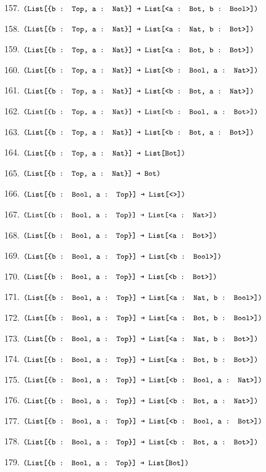 \documentclass[dvipsnames]{article}
\let\codeOrig\code
\renewcommand{\code}[2][]{%
  \ifmmode
    \if\relax\detokenize{#1}\relax
      \mathchoice{\mbox{\normalfont\small\ttfamily #2}}{\mbox{\normalfont\small\ttfamily #2}}{\mbox{\normalfont\small\ttfamily #2}}{\mbox{\normalfont\small\ttfamily #2}}%
    \else
      \mathchoice{\mbox{\normalfont\small\ttfamily #2}}{\mbox{\normalfont\small\ttfamily #2}}{\mbox{\normalfont\small\ttfamily #2}}{\mbox{\normalfont\small\ttfamily #2}}%
    \fi
  \else
    \codeOrig[#1]{#2}%
  \fi}
\begin{document}
\begin{enumerate}
      157. $\code{(List[\{b : Top, a : Nat\}] → List[<a : Bot, b : Bool>])}$

      158. $\code{(List[\{b : Top, a : Nat\}] → List[<a : Nat, b : Bot>])}$

      159. $\code{(List[\{b : Top, a : Nat\}] → List[<a : Bot, b : Bot>])}$

      160. $\code{(List[\{b : Top, a : Nat\}] → List[<b : Bool, a : Nat>])}$

      161. $\code{(List[\{b : Top, a : Nat\}] → List[<b : Bot, a : Nat>])}$

      162. $\code{(List[\{b : Top, a : Nat\}] → List[<b : Bool, a : Bot>])}$

      163. $\code{(List[\{b : Top, a : Nat\}] → List[<b : Bot, a : Bot>])}$

      164. $\code{(List[\{b : Top, a : Nat\}] → List[Bot])}$

      165. $\code{(List[\{b : Top, a : Nat\}] → Bot)}$

      166. $\code{(List[\{b : Bool, a : Top\}] → List[<>])}$

      167. $\code{(List[\{b : Bool, a : Top\}] → List[<a : Nat>])}$

      168. $\code{(List[\{b : Bool, a : Top\}] → List[<a : Bot>])}$

      169. $\code{(List[\{b : Bool, a : Top\}] → List[<b : Bool>])}$

      170. $\code{(List[\{b : Bool, a : Top\}] → List[<b : Bot>])}$

      171. $\code{(List[\{b : Bool, a : Top\}] → List[<a : Nat, b : Bool>])}$

      172. $\code{(List[\{b : Bool, a : Top\}] → List[<a : Bot, b : Bool>])}$

      173. $\code{(List[\{b : Bool, a : Top\}] → List[<a : Nat, b : Bot>])}$

      174. $\code{(List[\{b : Bool, a : Top\}] → List[<a : Bot, b : Bot>])}$

      175. $\code{(List[\{b : Bool, a : Top\}] → List[<b : Bool, a : Nat>])}$

      176. $\code{(List[\{b : Bool, a : Top\}] → List[<b : Bot, a : Nat>])}$

      177. $\code{(List[\{b : Bool, a : Top\}] → List[<b : Bool, a : Bot>])}$

      178. $\code{(List[\{b : Bool, a : Top\}] → List[<b : Bot, a : Bot>])}$

      179. $\code{(List[\{b : Bool, a : Top\}] → List[Bot])}$


\end{enumerate}
\end{document}
